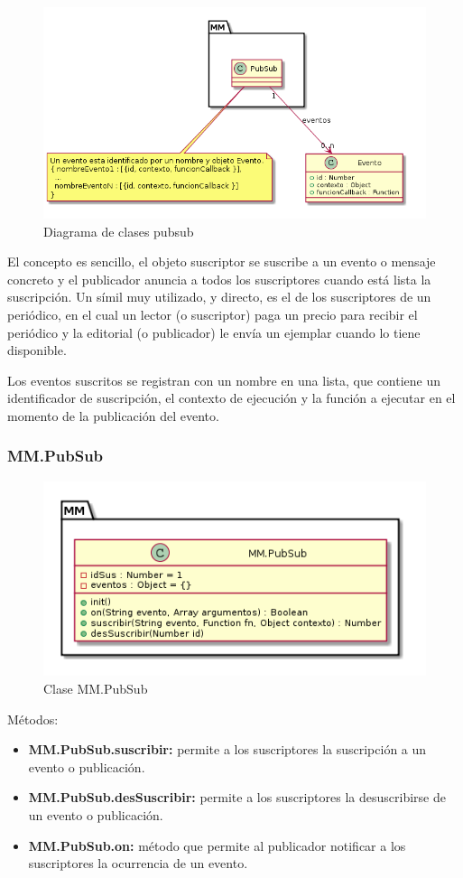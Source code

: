 \begin{figure}[tbph]
\centering
\includegraphics[width=\linewidth]{imagenes/diagrama-clases-mm-pubsub}
\caption{Diagrama de clases pubsub}
\label{fig:diagrama-clases-mm-pubsub}
\end{figure}


El concepto es sencillo, el objeto suscriptor se suscribe a un evento o mensaje concreto y el publicador anuncia a todos los 
suscriptores cuando está lista la suscripción. Un símil muy utilizado, y directo, es el de los suscriptores de un periódico, 
en el cual un lector (o suscriptor) paga un precio para recibir el periódico y la editorial (o publicador) le envía un ejemplar 
cuando lo tiene disponible. 


Los eventos suscritos se registran con un nombre en una lista, que contiene un identificador de suscripción, el contexto de 
ejecución y la función a ejecutar en el momento de la publicación del evento.

\subsubsection{MM.PubSub}
\begin{figure}[tbph]
\centering
\includegraphics[width=0.5\linewidth]{imagenes/diagrama-clase-mm-pubsub}
\caption{Clase MM.PubSub}
\label{fig:diagrama-clase-mm-pubsub}
\end{figure}

Métodos:
\begin{itemize}
\item \textbf{MM.PubSub.suscribir:} permite a los suscriptores la suscripción a un evento o publicación.
\item \textbf{MM.PubSub.desSuscribir:} permite a los suscriptores la desuscribirse de un evento o publicación.
\item \textbf{MM.PubSub.on:} método que permite al publicador notificar a los suscriptores
la ocurrencia de un evento. 
\end{itemize}





